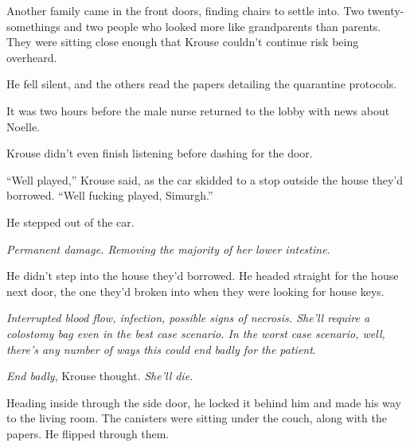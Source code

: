 Another family came in the front doors, finding chairs to settle into.  Two twenty-somethings and two people who looked more like grandparents than parents.  They were sitting close enough that Krouse couldn't continue risk being overheard.



He fell silent, and the others read the papers detailing the quarantine protocols.



It was two hours before the male nurse returned to the lobby with news about Noelle.



Krouse didn't even finish listening before dashing for the door.



\sectionbreak



``Well played,'' Krouse said, as the car skidded to a stop outside the house they'd borrowed.  ``Well fucking played, Simurgh.''



He stepped out of the car.



\emph{Permanent damage.  Removing the majority of her lower intestine.}



He didn't step into the house they'd borrowed.  He headed straight for the house next door, the one they'd broken into when they were looking for house keys.



\emph{Interrupted blood flow, infection, possible signs of necrosis.  She'll require a colostomy bag even in the best case scenario. In the worst case scenario, well, there's any number of ways this could end badly for the patient}.



\emph{End badly}, Krouse thought.  \emph{She'll die.}



Heading inside through the side door, he locked it behind him and made his way to the living room.  The canisters were sitting under the couch, along with the papers.  He flipped through them.


